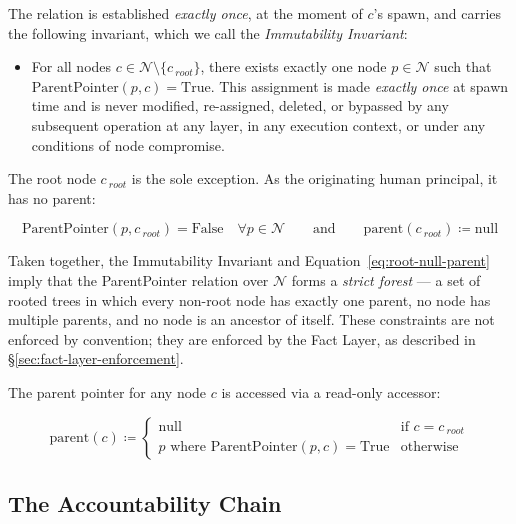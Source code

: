 The relation is established \textit{exactly once}, at the moment of $c$'s spawn, and carries the following invariant, which we call the \textit{Immutability Invariant}:

\begin{itemize}
\item[\textbf{Immutability Invariant (II):}] For all nodes $c \in \mathcal{N} \setminus \{c_{\ root}\}$, there exists exactly one node $p \in \mathcal{N}$ such that $\text{ParentPointer}(p, c) = \text{True}$. This assignment is made \textit{exactly once} at spawn time and is never modified, re-assigned, deleted, or bypassed by any subsequent operation at any layer, in any execution context, or under any conditions of node compromise.
\end{itemize}

The root node $c_{\ root}$ is the sole exception. As the originating human principal, it has no parent:

\begin{equation}
\text{ParentPointer}(p, c_{\ root}) = \text{False} \quad \forall p \in \mathcal{N}
\qquad\text{and}\qquad
\text{parent}(c_{\ root}) \coloneqq \text{null}
\label{eq:root-null-parent}
\end{equation}

Taken together, the Immutability Invariant and Equation~\ref{eq:root-null-parent} imply that the ParentPointer relation over $\mathcal{N}$ forms a \textit{strict forest} --- a set of rooted trees in which every non-root node has exactly one parent, no node has multiple parents, and no node is an ancestor of itself. These constraints are not enforced by convention; they are enforced by the Fact Layer, as described in \S\ref{sec:fact-layer-enforcement}.

The parent pointer for any node $c$ is accessed via a read-only accessor:

\begin{equation}
\text{parent}(c) \coloneqq
\begin{cases}
\text{null} & \text{if } c = c_{\ root} \\
p \text{ where } \text{ParentPointer}(p, c) = \text{True} & \text{otherwise}
\end{cases}
\label{eq:parent-accessor}
\end{equation}

\subsection{The Accountability Chain}
\label{sec:accountability-chain}

